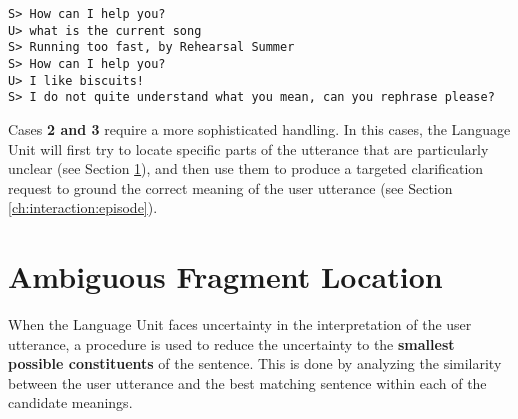 \texttt{S> How can I help you? \\
U> what is the current song \\
S> Running too fast, by Rehearsal Summer \\
S> How can I help you? \\
U> I like biscuits! \\
S> I do not quite understand what you mean, can you rephrase please?}

Cases \textbf{2 and 3} require a more sophisticated handling. In this cases, the Language Unit will first try to locate specific parts of the utterance that are particularly unclear (see Section \ref{ch:interaction:afl}), and then use them to produce a targeted clarification request to ground the correct meaning of the user utterance (see Section \ref{ch:interaction:episode}).


\section{Ambiguous Fragment Location} \label{ch:interaction:afl}
When the Language Unit faces uncertainty in the interpretation of the user utterance, a procedure is used to reduce the uncertainty to the \textbf{smallest possible constituents} of the sentence. This is done by analyzing the similarity between the user utterance and the best matching sentence within each of the candidate meanings.


